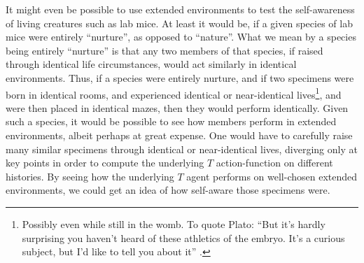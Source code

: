 \documentclass[runningheads]{llncs}
\begin{document}
It might even be possible to use extended environments to test the self-awareness
of living creatures such as lab mice. At least it would be, if a given species of
lab mice were entirely ``nurture'', as opposed to ``nature''. What we mean by a
species being entirely ``nurture'' is that any two members of that species,
if raised through identical life circumstances, would act similarly in identical environments.
Thus, if a species were entirely nurture, and if two specimens were born in identical
rooms, and experienced identical or near-identical lives\footnote{Possibly even
while still in the womb. To quote Plato: ``But it's hardly surprising you haven't
heard of these athletics of the embryo. It's a curious subject, but I'd like to
tell you about it'' \cite{platolaws}.},
and were then placed in identical mazes, then they would perform identically.
Given such a species, it would be possible to see how members perform in extended
environments, albeit perhaps at great expense. One would have to carefully raise many
similar specimens through identical or near-identical lives, diverging only at key
points in order to compute the underlying $T$ action-function on different histories.
By seeing how the underlying $T$ agent performs on well-chosen extended environments,
we could get an idea of how self-aware those specimens were.




\end{document}

